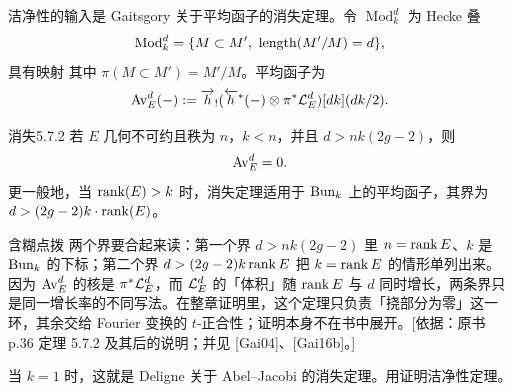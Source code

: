 洁净性的输入是 Gaitsgory 关于平均函子的消失定理\cite{Gai04,Gai16b}。令 $\operatorname{Mod}_k^d$ 为 Hecke 叠
\[\operatorname{Mod}_k^d=\{M\subset M',\ \length(M'/M)=d\},\]
具有映射
其中 $\pi(M\subset M')=M'/M$。平均函子为
\[\operatorname{Av}_E^d(-):=\overrightarrow h_!(\overleftarrow h^*(-)\otimes\pi^*\mathcal{L}_E^d)[dk](dk/2).\]
\begin{theorem}{消失}{5.7.2}
若 $E$ 几何不可约且秩为 $n$，$k<n$，并且 $d>nk(2g-2)$，则
\[\operatorname{Av}_E^d=0.\]
更一般地，当 $\operatorname{rank}(E)>k$ 时，消失定理适用于 $\operatorname{Bun}_k$ 上的平均函子，其界为 $d>(2g-2)k\cdot\operatorname{rank}(E)$。
\begin{transnote}{含糊点拨}
两个界要合起来读：第一个界 $d>nk(2g-2)$ 里 $n=\operatorname{rank} E$、$k$ 是 $\operatorname{Bun}_k$ 的下标；第二个界 $d>(2g-2)k\operatorname{rank} E$ 把 $k=\operatorname{rank} E$ 的情形单列出来。因为 $\operatorname{Av}_E^d$ 的核是 $\pi^*\mathcal{L}_E^d$，而 $\mathcal{L}_E^d$ 的「体积」随 $\operatorname{rank} E$ 与 $d$ 同时增长，两条界只是同一增长率的不同写法。在整章证明里，这个定理只负责「挠部分为零」这一环，其余交给 Fourier 变换的 $t$-正合性；证明本身不在书中展开。[依据：原书 p.36 定理 5.7.2 及其后的说明；并见 [Gai04]、[Gai16b]。]
\end{transnote}
\end{theorem}

当 $k=1$ 时，这就是 Deligne 关于 Abel–Jacobi 的消失定理。用证明洁净性定理。
